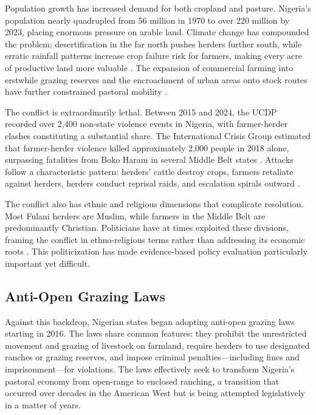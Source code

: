 \documentclass[12pt]{article}
\begin{document}
Population growth has increased demand for both cropland and pasture. Nigeria's population nearly quadrupled from 56 million in 1970 to over 220 million by 2023, placing enormous pressure on arable land. Climate change has compounded the problem: desertification in the far north pushes herders further south, while erratic rainfall patterns increase crop failure risk for farmers, making every acre of productive land more valuable \citep{odoh2014climate, hsiang2013quantifying}. The expansion of commercial farming into erstwhile grazing reserves and the encroachment of urban areas onto stock routes have further constrained pastoral mobility \citep{abbass2012no}.

The conflict is extraordinarily lethal. Between 2015 and 2024, the UCDP recorded over 2,400 non-state violence events in Nigeria, with farmer-herder clashes constituting a substantial share. The International Crisis Group estimated that farmer-herder violence killed approximately 2,000 people in 2018 alone, surpassing fatalities from Boko Haram in several Middle Belt states \citep{icg2018stopping}. Attacks follow a characteristic pattern: herders' cattle destroy crops, farmers retaliate against herders, herders conduct reprisal raids, and escalation spirals outward \citep{dimelu2016challenges}.

The conflict also has ethnic and religious dimensions that complicate resolution. Most Fulani herders are Muslim, while farmers in the Middle Belt are predominantly Christian. Politicians have at times exploited these divisions, framing the conflict in ethno-religious terms rather than addressing its economic roots \citep{suberu2001federalism}. This politicization has made evidence-based policy evaluation particularly important yet difficult.

\subsection{Anti-Open Grazing Laws}

Against this backdrop, Nigerian states began adopting anti-open grazing laws starting in 2016. The laws share common features: they prohibit the unrestricted movement and grazing of livestock on farmland, require herders to use designated ranches or grazing reserves, and impose criminal penalties---including fines and imprisonment---for violations. The laws effectively seek to transform Nigeria's pastoral economy from open-range to enclosed ranching, a transition that occurred over decades in the American West but is being attempted legislatively in a matter of years.
\end{document}
